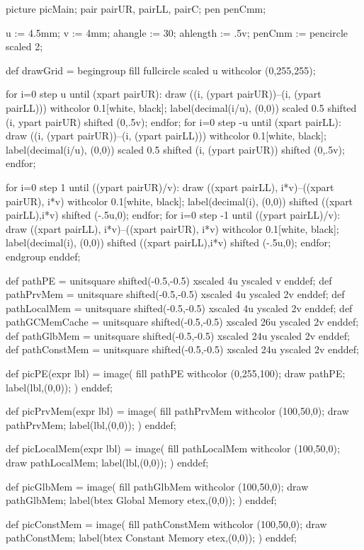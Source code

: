 
picture picMain;
pair pairUR, pairLL, pairC;
pen penCmm;

u := 4.5mm;
v := 4mm;
ahangle := 30;
ahlength := .5v;
penCmm := pencircle scaled 2;

def drawGrid =
begingroup
fill fullcircle scaled u withcolor (0,255,255);

for i=0 step u until (xpart pairUR):
	draw ((i, (ypart pairUR))--(i, (ypart pairLL))) withcolor 0.1[white, black];
	label(decimal(i/u), (0,0)) scaled 0.5 shifted (i, ypart pairUR) shifted (0,.5v);
endfor;
for i=0 step -u until (xpart pairLL):
	draw ((i, (ypart pairUR))--(i, (ypart pairLL)))  withcolor 0.1[white, black];
	label(decimal(i/u), (0,0)) scaled 0.5  shifted (i, (ypart pairUR)) shifted (0,.5v);
endfor;

for i=0 step 1 until ((ypart pairUR)/v):
	draw ((xpart pairLL), i*v)--((xpart pairUR), i*v) withcolor 0.1[white, black];
	label(decimal(i), (0,0)) shifted ((xpart pairLL),i*v) shifted (-.5u,0);
endfor;
for i=0 step -1 until ((ypart pairLL)/v):
	draw ((xpart pairLL), i*v)--((xpart pairUR), i*v) withcolor 0.1[white, black];
	label(decimal(i), (0,0)) shifted ((xpart pairLL),i*v) shifted (-.5u,0);
endfor;
endgroup
enddef;

def pathPE =
unitsquare shifted(-0.5,-0.5) xscaled 4u yscaled v
enddef;
def pathPrvMem =
unitsquare shifted(-0.5,-0.5) xscaled 4u yscaled 2v
enddef;
def pathLocalMem =
unitsquare shifted(-0.5,-0.5) xscaled 4u yscaled 2v
enddef;
def pathGCMemCache =
unitsquare shifted(-0.5,-0.5) xscaled 26u yscaled 2v
enddef;
def pathGlbMem =
unitsquare shifted(-0.5,-0.5) xscaled 24u yscaled 2v
enddef;
def pathConstMem =
unitsquare shifted(-0.5,-0.5) xscaled 24u yscaled 2v
enddef;

def picPE(expr lbl) =
image(
fill pathPE withcolor (0,255,100);
draw pathPE;
label(lbl,(0,0));
)
enddef;

def picPrvMem(expr lbl) =
image(
fill pathPrvMem withcolor (100,50,0);
draw pathPrvMem;
label(lbl,(0,0));
)
enddef;

def picLocalMem(expr lbl) =
image(
fill pathLocalMem withcolor (100,50,0);
draw pathLocalMem;
label(lbl,(0,0));
)
enddef;

def picGlbMem =
image(
fill pathGlbMem withcolor (100,50,0);
draw pathGlbMem;
label(btex Global Memory etex,(0,0));
)
enddef;

def picConstMem =
image(
fill pathConstMem withcolor (100,50,0);
draw pathConstMem;
label(btex Constant Memory etex,(0,0));
)
enddef;

